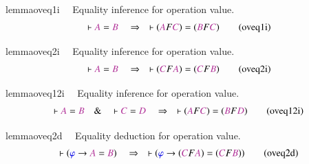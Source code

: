 \begin{restatable}{lemma}{oveq1i}~~ Equality inference for operation value. 
~
\begin{align}
\vdash \mc{A} = \mc{B}\quad\Rightarrow\quad \vdash ( \mc{A} F \mc{C} ) = (
    \mc{B} F \mc{C} )\label{eq:oveq1i}\tag{oveq1i}
\end{align}
\end{restatable}

\begin{restatable}{lemma}{oveq2i}~~ Equality inference for operation value. 
~
\begin{align}
\vdash \mc{A} = \mc{B}\quad\Rightarrow\quad \vdash ( \mc{C} F \mc{A} ) = (
    \mc{C} F \mc{B} )\label{eq:oveq2i}\tag{oveq2i}
\end{align}
\end{restatable}

\begin{restatable}{lemma}{oveq12i}~~ Equality inference for operation value. 
~  ~
\begin{align}
\vdash \mc{A} = \mc{B}\quad\&\quad \vdash \mc{C} = \mc{D}\quad\Rightarrow\quad
    \vdash ( \mc{A} F \mc{C} ) = ( \mc{B} F \mc{D}
    )\label{eq:oveq12i}\tag{oveq12i}
\end{align}
\end{restatable}

\begin{restatable}{lemma}{oveq2d}~~ Equality deduction for operation value. 
~
\begin{align}
\vdash ( \mw{\varphi} \rightarrow \mc{A} = \mc{B} )\quad\Rightarrow\quad \vdash
    ( \mw{\varphi} \rightarrow ( \mc{C} F \mc{A} ) = ( \mc{C} F \mc{B} )
    )\label{eq:oveq2d}\tag{oveq2d}
\end{align}
\end{restatable}

